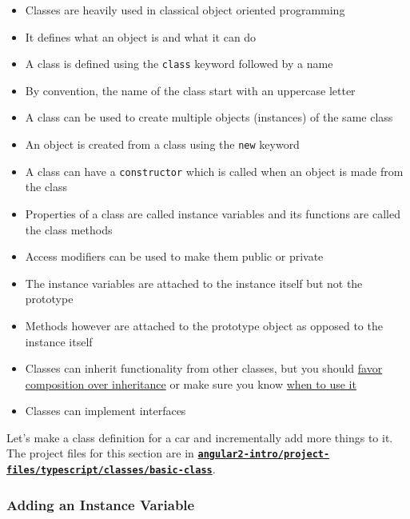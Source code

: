 \documentclass[12pt,]{article}
\providecommand{\tightlist}{%
  \setlength{\itemsep}{0pt}\setlength{\parskip}{0pt}}
\begin{document}
\begin{itemize}
\tightlist
\item
  Classes are heavily used in classical object oriented programming
\item
  It defines what an object is and what it can do
\item
  A class is defined using the \texttt{class} keyword followed by a name
\item
  By convention, the name of the class start with an uppercase letter
\item
  A class can be used to create multiple objects (instances) of the same
  class
\item
  An object is created from a class using the \texttt{new} keyword
\item
  A class can have a \texttt{constructor} which is called when an object
  is made from the class
\item
  Properties of a class are called instance variables and its functions
  are called the class methods
\item
  Access modifiers can be used to make them public or private
\item
  The instance variables are attached to the instance itself but not the
  prototype
\item
  Methods however are attached to the prototype object as opposed to the
  instance itself
\item
  Classes can inherit functionality from other classes, but you should
  \href{https://medium.com/javascript-scene/the-two-pillars-of-javascript-ee6f3281e7f3\#.oc5pdevwh}{favor
  composition over inheritance} or make sure you know
  \href{https://medium.com/@dtinth/es6-class-classical-inheritance-20f4726f4c4\#.xdif2m42e}{when
  to use it}
\item
  Classes can implement interfaces
\end{itemize}

Let's make a class definition for a car and incrementally add more
things to it. The project files for this section are in
\href{https://github.com/st32lth/angular2-intro/tree/master/project-files/typescript/classes/basic-class}{\textbf{\texttt{angular2-intro/project-files/typescript/classes/basic-class}}}.

\subsubsection{Adding an Instance
Variable}\label{adding-an-instance-variable}
\end{document}
